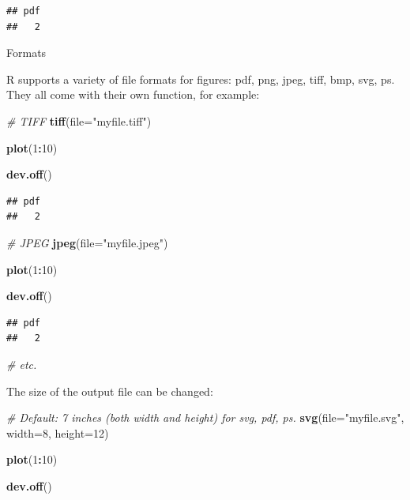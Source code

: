 \documentclass[]{book}
\newenvironment{Shaded}{\begin{snugshade}}{\end{snugshade}}
\newcommand{\CommentTok}[1]{\textcolor[rgb]{0.56,0.35,0.01}{\textit{#1}}}
\newcommand{\DataTypeTok}[1]{\textcolor[rgb]{0.13,0.29,0.53}{#1}}
\newcommand{\DecValTok}[1]{\textcolor[rgb]{0.00,0.00,0.81}{#1}}
\newcommand{\KeywordTok}[1]{\textcolor[rgb]{0.13,0.29,0.53}{\textbf{#1}}}
\newcommand{\NormalTok}[1]{#1}
\newcommand{\OperatorTok}[1]{\textcolor[rgb]{0.81,0.36,0.00}{\textbf{#1}}}
\newcommand{\StringTok}[1]{\textcolor[rgb]{0.31,0.60,0.02}{#1}}
\begin{document}
\begin{verbatim}
## pdf 
##   2
\end{verbatim}

Formats

R supports a variety of file formats for figures: pdf, png, jpeg, tiff, bmp, svg, ps.
They all come with their own function, for example:

\begin{Shaded}
\begin{Highlighting}[]
\CommentTok{# TIFF}
\KeywordTok{tiff}\NormalTok{(}\DataTypeTok{file=}\StringTok{"myfile.tiff"}\NormalTok{)}

    \KeywordTok{plot}\NormalTok{(}\DecValTok{1}\OperatorTok{:}\DecValTok{10}\NormalTok{)}

\KeywordTok{dev.off}\NormalTok{()}
\end{Highlighting}
\end{Shaded}

\begin{verbatim}
## pdf 
##   2
\end{verbatim}

\begin{Shaded}
\begin{Highlighting}[]
\CommentTok{# JPEG}
\KeywordTok{jpeg}\NormalTok{(}\DataTypeTok{file=}\StringTok{"myfile.jpeg"}\NormalTok{)}

    \KeywordTok{plot}\NormalTok{(}\DecValTok{1}\OperatorTok{:}\DecValTok{10}\NormalTok{)}

\KeywordTok{dev.off}\NormalTok{()}
\end{Highlighting}
\end{Shaded}

\begin{verbatim}
## pdf 
##   2
\end{verbatim}

\begin{Shaded}
\begin{Highlighting}[]
\CommentTok{# etc.}
\end{Highlighting}
\end{Shaded}

The size of the output file can be changed:

\begin{Shaded}
\begin{Highlighting}[]
\CommentTok{# Default: 7 inches (both width and height) for svg, pdf, ps.}
\KeywordTok{svg}\NormalTok{(}\DataTypeTok{file=}\StringTok{"myfile.svg"}\NormalTok{, }\DataTypeTok{width=}\DecValTok{8}\NormalTok{, }\DataTypeTok{height=}\DecValTok{12}\NormalTok{)}

    \KeywordTok{plot}\NormalTok{(}\DecValTok{1}\OperatorTok{:}\DecValTok{10}\NormalTok{)}

\KeywordTok{dev.off}\NormalTok{()}
\end{Highlighting}
\end{Shaded}
\end{document}
